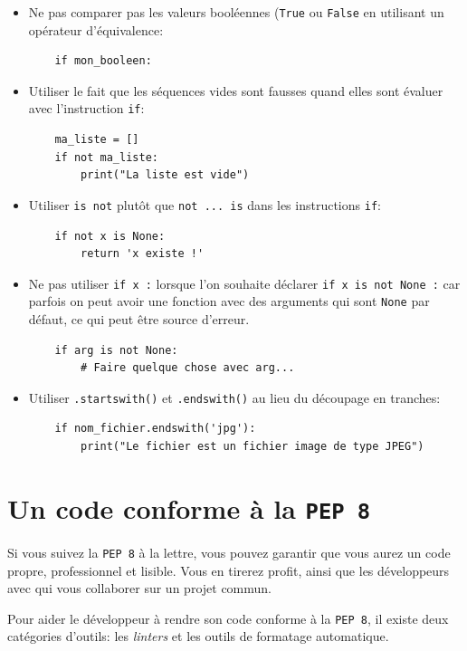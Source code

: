 \documentclass[a4paper,12pt]{book}
\begin{document}
\begin{itemize}
	\item Ne  pas comparer pas les valeurs booléennes  (\texttt{True} ou \texttt{False} en utilisant un opérateur d'équivalence:
	\begin{lstlisting}
	if mon_booleen:
	\end{lstlisting}
	\item Utiliser le fait que les séquences vides sont fausses quand elles sont évaluer avec l'instruction \texttt{if}:
	\begin{lstlisting}
	ma_liste = []
	if not ma_liste:
	    print("La liste est vide")
	\end{lstlisting}
	\item Utiliser \texttt{is not} plutôt que \texttt{not ... is} dans les instructions \texttt{if}:
	\begin{lstlisting}
	if not x is None:
	    return 'x existe !'
	\end{lstlisting}
    \item Ne pas utiliser \texttt{if x :} lorsque l'on souhaite déclarer \texttt{if x is not None :} car parfois on peut avoir une fonction avec des arguments qui sont \texttt{None} par défaut, ce qui peut être source d'erreur.
    \begin{lstlisting}
    if arg is not None:
        # Faire quelque chose avec arg...
    \end{lstlisting}
    \item Utiliser \texttt{.startswith()} et \texttt{.endswith()} au lieu du découpage en tranches:
    \begin{lstlisting}
    if nom_fichier.endswith('jpg'):
        print("Le fichier est un fichier image de type JPEG")
    \end{lstlisting}
\end{itemize}
\medskip

\section{Un code conforme à la \texttt{PEP 8}}
Si vous suivez la \texttt{PEP 8} à la lettre, vous pouvez garantir que vous aurez un code propre, professionnel et lisible. Vous en tirerez profit, ainsi que les développeurs avec qui vous collaborer sur un projet commun.
\medskip

Pour aider le développeur à rendre son code conforme à la \texttt{PEP 8}, il existe deux catégories d'outils: les \textit{linters} et les outils de formatage automatique.
\medskip
\end{document}
